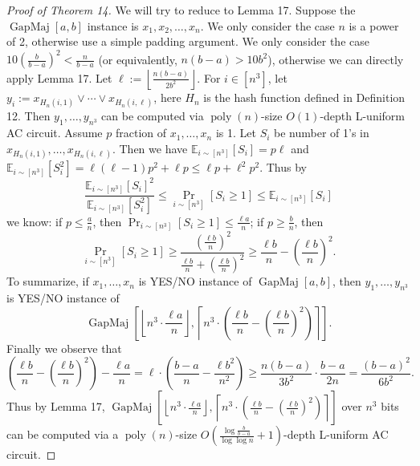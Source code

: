 \begin{proof}[Proof of Theorem 14]
We will try to reduce to Lemma 17. Suppose the $\operatorname{GapMaj}[a,b]$ instance is $x_1,x_2,\ldots,x_n$. We only consider the case $n$ is a power of 2, otherwise use a simple padding argument. We only consider the case $10\left(\frac b{b-a}\right)^2<\frac n{b-a}$ (or equivalently, $n(b-a)>10b^2$), otherwise we can directly apply Lemma 17.
Let $\ell:=\left\lfloor\frac{n(b-a)}{2b^2}\right\rfloor$. For $i\in[n^3]$, let $y_i:=x_{H_n(i,1)}\vee\cdots\vee x_{H_n(i,\ell)}$, here $H_n$ is the hash function defined in Definition 12. Then $y_1,\ldots,y_{n^3}$ can be computed via $\operatorname{poly}(n)$-size $O(1)$-depth L-uniform AC circuit.
Assume $p$ fraction of $x_1,\ldots,x_n$ is 1. Let $S_i$ be number of 1's in $x_{H_n(i,1)},\ldots,x_{H_n(i,\ell)}$. Then we have $\mathbb E_{i\sim[n^3]}[S_i]=p\ell$ and $\mathbb E_{i\sim[n^3]}[S_i^2]=\ell(\ell-1)p^2+\ell p\le\ell p+\ell^2 p^2$. Thus by
\[\frac{\mathbb E_{i\sim[n^3]}[S_i]^2}{\mathbb E_{i\sim[n^3]}[S_i^2]}\le\Pr_{i\sim[n^3]}[S_i\ge1]\le\mathbb E_{i\sim[n^3]}[S_i]\]
we know: if $p\le\frac an$, then $\Pr_{i\sim[n^3]}[S_i\ge1]\le\frac{\ell a}n$; if $p\ge\frac bn$, then
\[\Pr_{i\sim[n^3]}[S_i\ge1]\ge\frac{(\frac{\ell b}n)^2}{\frac{\ell b}n+(\frac{\ell b}n)^2}\ge\frac{\ell b}n-\left(\frac{\ell b}n\right)^2.\]
To summarize, if $x_1,\ldots,x_n$ is YES/NO instance of $\operatorname{GapMaj}[a,b]$, then $y_1,\ldots,y_{n^3}$ is YES/NO instance of
\[\operatorname{GapMaj}\left[\left\lfloor n^3\cdot\frac{\ell a}n\right\rfloor,\left\lceil n^3\cdot\left(\frac{\ell b}n-\left(\frac{\ell b}n\right)^2\right)\right\rceil\right].\]
Finally we observe that
\[\left(\frac{\ell b}n-\left(\frac{\ell b}n\right)^2\right)-\frac{\ell a}n=\ell\cdot\left(\frac{b-a}n-\frac{\ell b^2}{n^2}\right)\ge\frac{n(b-a)}{3b^2}\cdot\frac{b-a}{2n}=\frac{(b-a)^2}{6b^2}.\]
Thus by Lemma 17, $\operatorname{GapMaj}\left[\left\lfloor n^3\cdot\frac{\ell a}n\right\rfloor,\left\lceil n^3\cdot\left(\frac{\ell b}n-\left(\frac{\ell b}n\right)^2\right)\right\rceil\right]$ over $n^3$ bits can be computed via a $\operatorname{poly}(n)$-size $O\left(\frac{\log\frac b{b-a}}{\log\log n}+1\right)$-depth L-uniform AC circuit.
\end{proof}
